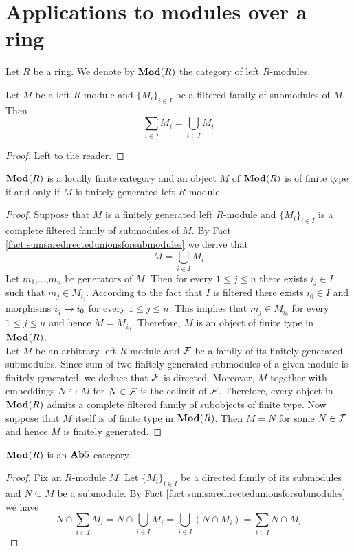 \section{Applications to modules over a ring}
\noindent
Let $R$ be a ring. We denote by $\mathbf{Mod}(R)$ the category of left $R$-modules.

\begin{fact}\label{fact:sumsaredirectedunionsforsubmodules}
Let $M$ be a left $R$-module and $\{M_i\}_{i\in I}$ be a filtered family of submodules of $M$. Then
$$\sum_{i\in I}M_i = \bigcup_{i\in I}M_i$$
\end{fact}
\begin{proof}
Left to the reader.
\end{proof}

\begin{proposition}\label{proposition:modulesarelocallyfinite}
$\mathbf{Mod}(R)$ is a locally finite category and an object $M$ of $\mathbf{Mod}(R)$ is of finite type if and only if $M$ is finitely generated left $R$-module.
\end{proposition}
\begin{proof}
Suppose that $M$ is a finitely generated left $R$-module and $\{M_i\}_{i\in I}$ is a complete filtered family of submodules of $M$. By Fact \ref{fact:sumsaredirectedunionsforsubmodules} we derive that $$M = \bigcup_{i\in I}M_i$$
Let $m_1$,...,$m_n$ be generators of $M$. Then for every $1\leq j\leq n$ there exists $i_j\in I$ such that $m_j\in M_{i_j}$. According to the fact that $I$ is filtered there exists $i_0\in I$ and morphisms $i_j\rightarrow i_0$ for every $1\leq j\leq n$. This implies that $m_j\in M_{i_0}$ for every $1\leq j\leq n$ and hence $M = M_{i_0}$. Therefore, $M$ is an object of finite type in $\mathbf{Mod}(R)$.\\ 
Let $M$ be an arbitrary left $R$-module and ${\mathcal F}$ be a family of its finitely generated submodules. Since sum of two finitely generated submodules of a given module is finitely generated, we deduce that ${\mathcal F}$ is directed. Moreover, $M$ together with embeddings $N\hookrightarrow M$ for $N\in {\mathcal F}$ is the colimit of ${\mathcal F}$. Therefore, every object in $\mathbf{Mod}(R)$ admits a complete filtered family of subobjects of finite type. Now suppose that $M$ itself is of finite type in $\mathbf{Mod}(R)$. Then $M = N$ for some $N\in {\mathcal F}$ and hence $M$ is finitely generated.
\end{proof}

\begin{proposition}\label{proposition:modulesformab5category}
$\mathbf{Mod}(R)$ is an $\mathbf{Ab}5$-category.
\end{proposition}
\begin{proof}
Fix an $R$-module $M$. Let $\{M_i\}_{i\in I}$ be a directed family of its submodules and $N\subseteq M$ be a submodule. By Fact \ref{fact:sumsaredirectedunionsforsubmodules} we have
$$N\cap \sum_{i\in I}M_i = N\cap \bigcup_{i\in I}M_i = \bigcup_{i\in I}\left(N\cap M_i\right) = \sum_{i\in I}N\cap M_i$$ 
\end{proof}

